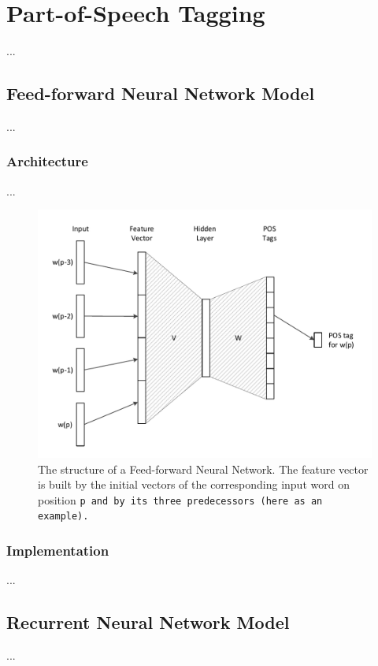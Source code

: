 \chapter{Part-of-Speech Tagging}\label{c.postagging}
...

\section{Feed-forward Neural Network Model}\label{c.postagging.fnn}
...

\subsection{Architecture}\label{c.postagging.fnn.architecture}
...

\begin{figure}[H]
	\includegraphics[width=\textwidth]{images/fnn_structure}
	\caption{The structure of a Feed-forward Neural Network. The feature vector is built by the initial vectors of the corresponding input word on position \tt{p} and by its three predecessors (here as an example).}\label{f.fnn_structure}
\end{figure}

\subsection{Implementation}\label{c.postagging.fnn.implementation}
...

\section{Recurrent Neural Network Model}\label{c.postagging.rnn}
...

